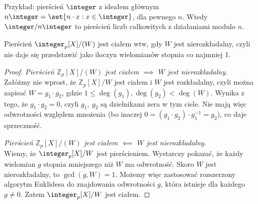 Przykład: pierścień \( \integer \) z ideałem głównym \( n \integer = \set{n \cdot x : x \in \integer} \), dla pewnego \( n \).
Wtedy \( \integer / n\integer \) to pierścień liczb całkowitych z działaniami modulo \( n \).
\begin{theorem}
	Pierścień \( \integer_p[X]/(W) \) jest ciałem wtw, gdy \( W \) jest nierozkładalny, czyli nie daje się przedstawić jako iloczyn wielomianów stopnia co najmniej 1.
\end{theorem}
\begin{proof}
	\textit{Pierścień \( \mathbb{Z}_p[X]/(W) \) jest ciałem \( \implies \) \( W \) jest nierozkładalny.} \\
	Załóżmy nie wprost, że \( \mathbb{Z}_p[X]/W \) jest ciałem i \( W \) jest rozkładalny, czyli można zapisać \linebreak \( W = g_1 \cdot g_2 \), gdzie \( 1 \leq \deg(g_1), \deg(g_2) < \deg(W) \).
	Wynika z tego, że \( g_1 \cdot g_2 = 0 \), czyli \( g_1, \ g_2 \) są dzielnikami zera w tym ciele. Nie mają więc odwrotności względem mnożenia (bo inaczej \(0 = (g_1 \cdot g_2) \cdot g_1^{-1} = g_2\)), co daje sprzeczność.

	\textit{Pierścień \( \mathbb{Z}_p[X]/(W) \) jest ciałem \( \impliedby \) \( W \) jest nierozkładalny.} \\
	Wiemy, że \( \integer_p[X]/W \) jest pierścieniem. Wystarczy pokazać, że każdy wielomian \( g \) stopnia mniejszego niż \( W \) ma odwrotność.
	Skoro \( W \) jest nierozkładalny, to \( \gcd(g, W) = 1 \). Możemy więc zastosować rozszerzony algorytm Euklidesa do znajdowania odwrotności \( g \), która istnieje dla każdego \( g \neq 0 \). Zatem \( \integer_p[X]/W \) jest ciałem.
\end{proof}
